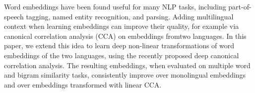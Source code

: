 Word embeddings have been found useful for many NLP tasks, including part-of-speech tagging, named entity recognition, and parsing. Adding multilingual context when learning embeddings can improve their quality, for example via canonical correlation analysis (CCA) on embeddings fromtwo languages. In this paper, we extend this idea to learn deep non-linear transformations of word embeddings of the two languages, using the recently proposed deep canonical correlation analysis. The resulting embeddings, when evaluated on multiple word and bigram similarity tasks, consistently improve over monolingual embeddings and over embeddings transformed with linear CCA.
